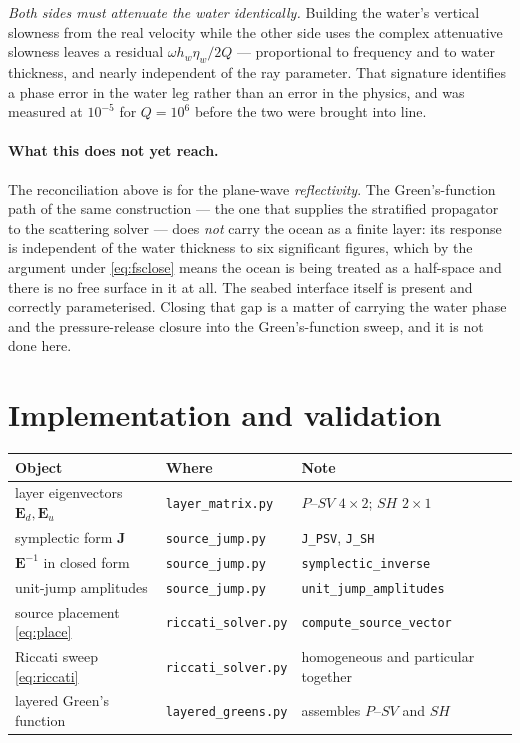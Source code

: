 \documentclass[11pt,a4paper]{article}
\newcommand{\bJ}{\mathbf{J}}
\newcommand{\bE}{\mathbf{E}}
\begin{document}
\emph{Both sides must attenuate the water identically.} Building the water's
vertical slowness from the real velocity while the other side uses the complex
attenuative slowness leaves a residual $\omega h_w\eta_w/2Q$ --- proportional to
frequency and to water thickness, and nearly independent of the ray parameter.
That signature identifies a phase error in the water leg rather than an error in
the physics, and was measured at $10^{-5}$ for $Q=10^{6}$ before the two were
brought into line.

\paragraph{What this does not yet reach.} The reconciliation above is for the
plane-wave \emph{reflectivity}. The Green's-function path of the same
construction --- the one that supplies the stratified propagator to the
scattering solver --- does \emph{not} carry the ocean as a finite layer: its
response is independent of the water thickness to six significant figures, which
by the argument under \eqref{eq:fsclose} means the ocean is being treated as a
half-space and there is no free surface in it at all. The seabed interface
itself is present and correctly parameterised. Closing that gap is a matter of
carrying the water phase and the pressure-release closure into the
Green's-function sweep, and it is not done here.

\section{Implementation and validation}

\begin{center}
\begin{tabular}{lll}
\toprule
Object & Where & Note \\
\midrule
layer eigenvectors $\bE_d,\bE_u$ & \texttt{layer\_matrix.py} & $P$--$SV$ $4\times2$; $SH$ $2\times1$\\
symplectic form $\bJ$ & \texttt{source\_jump.py} & \texttt{J\_PSV}, \texttt{J\_SH}\\
$\bE^{-1}$ in closed form & \texttt{source\_jump.py} & \texttt{symplectic\_inverse}\\
unit-jump amplitudes & \texttt{source\_jump.py} & \texttt{unit\_jump\_amplitudes}\\
source placement \eqref{eq:place} & \texttt{riccati\_solver.py} & \texttt{compute\_source\_vector}\\
Riccati sweep \eqref{eq:riccati} & \texttt{riccati\_solver.py} & homogeneous and particular together\\
layered Green's function & \texttt{layered\_greens.py} & assembles $P$--$SV$ and $SH$\\
\bottomrule
\end{tabular}
\end{center}
\end{document}

